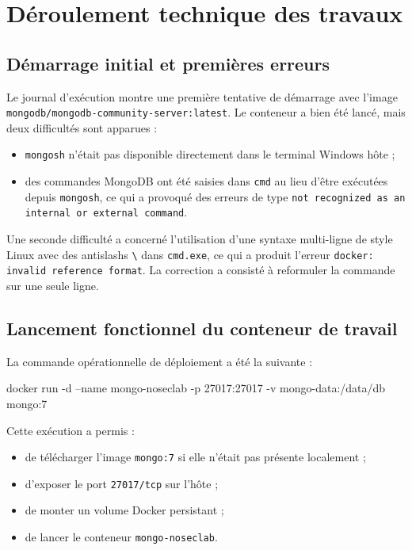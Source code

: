 \documentclass[11pt,a4paper]{article}
\begin{document}
\section{Déroulement technique des travaux}

\subsection{Démarrage initial et premières erreurs}

Le journal d'exécution montre une première tentative de démarrage avec l'image \texttt{mongodb/mongodb-community-server:latest}. Le conteneur a bien été lancé, mais deux difficultés sont apparues :

\begin{itemize}
  \item \texttt{mongosh} n'était pas disponible directement dans le terminal Windows hôte ;
  \item des commandes MongoDB ont été saisies dans \texttt{cmd} au lieu d'être exécutées depuis \texttt{mongosh}, ce qui a provoqué des erreurs de type \texttt{not recognized as an internal or external command}.
\end{itemize}

Une seconde difficulté a concerné l'utilisation d'une syntaxe multi-ligne de style Linux avec des antislashs \texttt{\textbackslash} dans \texttt{cmd.exe}, ce qui a produit l'erreur \texttt{docker: invalid reference format}. La correction a consisté à reformuler la commande sur une seule ligne.

\subsection{Lancement fonctionnel du conteneur de travail}

La commande opérationnelle de déploiement a été la suivante :

\begin{codeblock}
docker run -d --name mongo-noseclab -p 27017:27017 -v mongo-data:/data/db mongo:7
\end{codeblock}

Cette exécution a permis :
\begin{itemize}
  \item de télécharger l'image \texttt{mongo:7} si elle n'était pas présente localement ;
  \item d'exposer le port \texttt{27017/tcp} sur l'hôte ;
  \item de monter un volume Docker persistant ;
  \item de lancer le conteneur \texttt{mongo-noseclab}.
\end{itemize}
\end{document}
